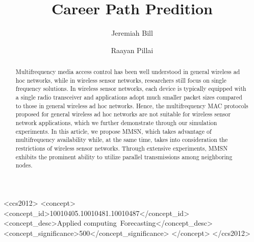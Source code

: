 \documentclass[format=acmsmall, review=false, screen=true]{acmart}
\begin{document}
\title{Career Path Predition}

\author{Jeremiah Bill}

\author{Raayan Pillai}


  
\begin{abstract}
Multifrequency media access control has been well understood in
general wireless ad hoc networks, while in wireless sensor networks,
researchers still focus on single frequency solutions. In wireless
sensor networks, each device is typically equipped with a single
radio transceiver and applications adopt much smaller packet sizes
compared to those in general wireless ad hoc networks. Hence, the
multifrequency MAC protocols proposed for general wireless ad hoc
networks are not suitable for wireless sensor network applications,
which we further demonstrate through our simulation experiments. In
this article, we propose MMSN, which takes advantage of
multifrequency availability while, at the same time, takes into
consideration the restrictions of wireless sensor networks. Through
extensive experiments, MMSN exhibits the prominent ability to utilize
parallel transmissions among neighboring nodes. 
\end{abstract}


%
%
\begin{CCSXML}
	<ccs2012>
	<concept>
	<concept_id>10010405.10010481.10010487</concept_id>
	<concept_desc>Applied computing~Forecasting</concept_desc>
	<concept_significance>500</concept_significance>
	</concept>
	</ccs2012>
\end{CCSXML}




%
%






\maketitle

\renewcommand{\shortauthors}{J. Bill et al.}


\end{document}
